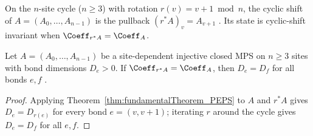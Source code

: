 \begin{definition}%
    \label{def:peps_cycle_tensor_cyclic_shift}
    \leanok
    On the $n$-site cycle ($n\ge 3$) with rotation $r(v)=v+1\bmod n$, the cyclic
    shift of $A=(A_0,\ldots,A_{n-1})$ is the pullback $(r^*A)_v=A_{v+1}$
    \cite[lines~1807--1827]{Molnar2018NormalPEPS}. Its state is cyclic-shift
    invariant when $\Coeff_{r^*A}=\Coeff_A$.
\end{definition}

\begin{corollary}%
    \label{cor:peps_cycle_shift_bond_uniform}
    \leanok
    Let $A=(A_0,\ldots,A_{n-1})$ be a site-dependent injective closed MPS on
    $n\ge 3$ sites with bond dimensions $D_e>0$. If $\Coeff_{r^*A}=\Coeff_A$,
    then $D_e=D_f$ for all bonds $e,f$
    \cite[lines~1803--1842]{Molnar2018NormalPEPS}.
\end{corollary}
\begin{proof}\leanok
    Applying Theorem~\ref{thm:fundamentalTheorem_PEPS} to $A$ and $r^*A$ gives
    $D_e=D_{r(e)}$ for every bond $e=(v,v+1)$; iterating $r$ around the cycle
    gives $D_e=D_f$ for all $e,f$.
\end{proof}

